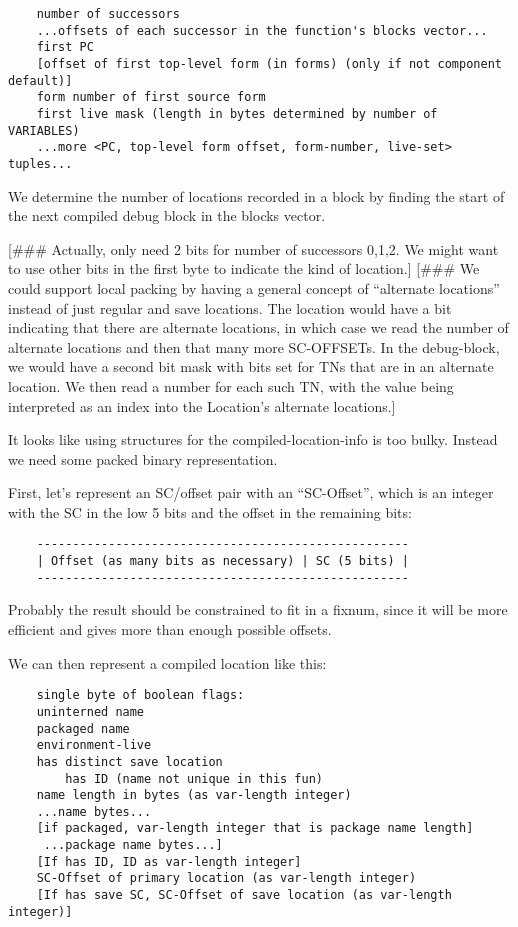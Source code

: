 \begin{verbatim}
    number of successors
    ...offsets of each successor in the function's blocks vector...
    first PC
    [offset of first top-level form (in forms) (only if not component default)]
    form number of first source form
    first live mask (length in bytes determined by number of VARIABLES)
    ...more <PC, top-level form offset, form-number, live-set> tuples...
\end{verbatim}

We determine the number of locations recorded in a block by finding the
start of the next compiled debug block in the blocks vector.

[\#\#\# Actually, only need 2 bits for number of successors {0,1,2}.  We might
want to use other bits in the first byte to indicate the kind of location.]
[\#\#\# We could support local packing by having a general concept of ``alternate
locations'' instead of just regular and save locations.  The location would have
a bit indicating that there are alternate locations, in which case we read the
number of alternate locations and then that many more SC-OFFSETs.  In the
debug-block, we would have a second bit mask with bits set for TNs that are in
an alternate location.  We then read a number for each such TN, with the value
being interpreted as an index into the Location's alternate locations.]



It looks like using structures for the compiled-location-info is too bulky.
Instead we need some packed binary representation.

First, let's represent an SC/offset pair with an ``SC-Offset'', which is an
integer with the SC in the low 5 bits and the offset in the remaining bits:
\begin{verbatim}
    ----------------------------------------------------
    | Offset (as many bits as necessary) | SC (5 bits) |
    ----------------------------------------------------
\end{verbatim}
Probably the result should be constrained to fit in a fixnum, since it will be
more efficient and gives more than enough possible offsets.

We can then represent a compiled location like this:
\begin{verbatim}
    single byte of boolean flags:
	uninterned name
	packaged name
	environment-live
	has distinct save location
        has ID (name not unique in this fun)
    name length in bytes (as var-length integer)
    ...name bytes...
    [if packaged, var-length integer that is package name length]
     ...package name bytes...]
    [If has ID, ID as var-length integer]
    SC-Offset of primary location (as var-length integer)
    [If has save SC, SC-Offset of save location (as var-length integer)]
\end{verbatim}


